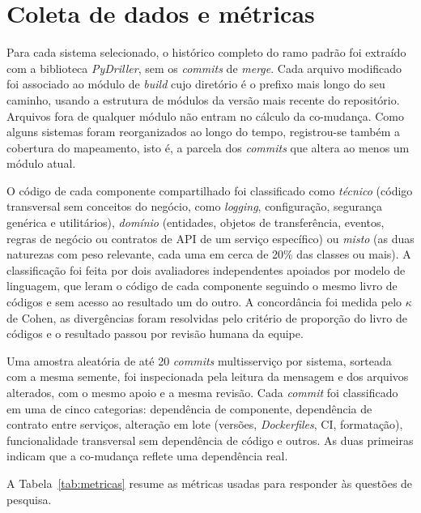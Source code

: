 \section{Coleta de dados e métricas}
\label{sec:coleta-metricas}

Para cada sistema selecionado, o histórico completo do ramo padrão foi extraído com a biblioteca \textit{PyDriller}, sem os \textit{commits} de \textit{merge}. Cada arquivo modificado foi associado ao módulo de \textit{build} cujo diretório é o prefixo mais longo do seu caminho, usando a estrutura de módulos da versão mais recente do repositório. Arquivos fora de qualquer módulo não entram no cálculo da co-mudança. Como alguns sistemas foram reorganizados ao longo do tempo, registrou-se também a cobertura do mapeamento, isto é, a parcela dos \textit{commits} que altera ao menos um módulo atual.

O código de cada componente compartilhado foi classificado como \textit{técnico} (código transversal sem conceitos do negócio, como \textit{logging}, configuração, segurança genérica e utilitários), \textit{domínio} (entidades, objetos de transferência, eventos, regras de negócio ou contratos de API de um serviço específico) ou \textit{misto} (as duas naturezas com peso relevante, cada uma em cerca de 20\% das classes ou mais). A classificação foi feita por dois avaliadores independentes apoiados por modelo de linguagem, que leram o código de cada componente seguindo o mesmo livro de códigos e sem acesso ao resultado um do outro. A concordância foi medida pelo $\kappa$ de Cohen, as divergências foram resolvidas pelo critério de proporção do livro de códigos e o resultado passou por revisão humana da equipe.

Uma amostra aleatória de até 20 \textit{commits} multisserviço por sistema, sorteada com a mesma semente, foi inspecionada pela leitura da mensagem e dos arquivos alterados, com o mesmo apoio e a mesma revisão. Cada \textit{commit} foi classificado em uma de cinco categorias: dependência de componente, dependência de contrato entre serviços, alteração em lote (versões, \textit{Dockerfiles}, CI, formatação), funcionalidade transversal sem dependência de código e outros. As duas primeiras indicam que a co-mudança reflete uma dependência real.

A Tabela~\ref{tab:metricas} resume as métricas usadas para responder às questões de pesquisa.

